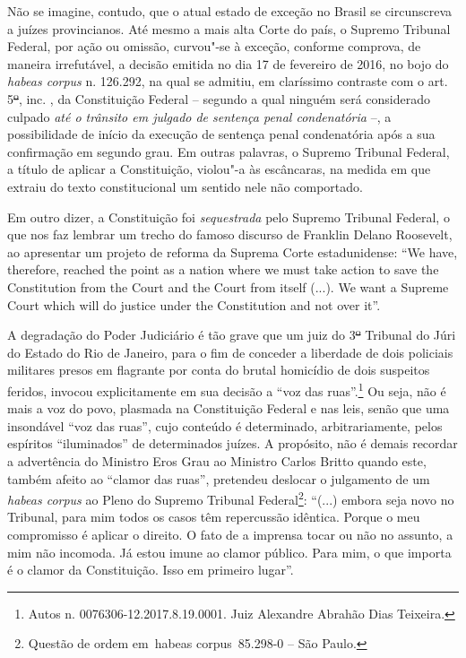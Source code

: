 Não se imagine, contudo, que o atual estado de exceção no Brasil se
circunscreva a juízes provincianos. Até mesmo a mais alta Corte do país,
o Supremo Tribunal Federal, por ação ou omissão, curvou"-se à exceção,
conforme comprova, de maneira irrefutável, a decisão emitida no dia 17
de fevereiro de 2016, no bojo do \emph{habeas corpus} n. 126.292, na
qual se admitiu, em claríssimo contraste com o art. 5\sout{º}, inc.
, da Constituição Federal -- segundo a qual ninguém será considerado
culpado \emph{até o trânsito em julgado de sentença penal condenatória}
--, a possibilidade de início da execução de sentença penal condenatória
após a sua confirmação em segundo grau. Em outras palavras, o Supremo
Tribunal Federal, a título de aplicar a Constituição, violou"-a às
escâncaras, na medida em que extraiu do texto constitucional um sentido
nele não comportado.

Em outro dizer, a Constituição foi \emph{sequestrada} pelo Supremo
Tribunal Federal, o que nos faz lembrar um trecho do famoso discurso de
Franklin Delano Roosevelt, ao apresentar um projeto de reforma da
Suprema Corte estadunidense: ``We have, therefore, reached the point as
a nation where we must take action to save the Constitution from the
Court and the Court from itself (...). We want a Supreme Court which
will do justice under the Constitution and not over it''.

A degradação do Poder Judiciário é tão grave que um juiz do 3\sout{º}
Tribunal do Júri do Estado do Rio de Janeiro, para o fim de conceder a
liberdade de dois policiais militares presos em flagrante por conta do
brutal homicídio de dois suspeitos feridos, invocou explicitamente em
sua decisão a ``voz das ruas''.\footnote{Autos n.
  0076306-12.2017.8.19.0001. Juiz Alexandre Abrahão Dias Teixeira.} Ou
seja, não é mais a voz do povo, plasmada na Constituição Federal e nas
leis, senão que uma insondável ``voz das ruas'', cujo conteúdo é
determinado, arbitrariamente, pelos espíritos ``iluminados'' de
determinados juízes. A propósito, não é demais recordar a advertência do
Ministro Eros Grau ao Ministro Carlos Britto quando este, também afeito
ao ``clamor das ruas'', pretendeu deslocar o julgamento de um
\emph{habeas corpus} ao Pleno do Supremo Tribunal Federal\footnote{Questão
  de ordem em~habeas corpus~85.298-0 -- São Paulo.}: ``(...) embora seja
novo no Tribunal, para mim todos os casos têm repercussão idêntica.
Porque o meu compromisso é aplicar o direito. O fato de a imprensa tocar
ou não no assunto, a mim não incomoda. Já estou imune ao clamor público.
Para mim, o que importa é o clamor da Constituição. Isso em primeiro
lugar''.

